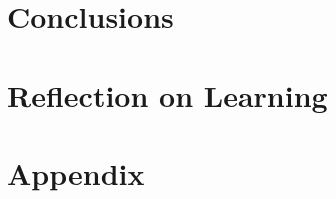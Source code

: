\documentclass[12pt, conference, final, a4paper, onecolumn, compsoc]{IEEEtran}
\begin{document}
\subsection*{}

\section{Conclusions}
\subsection*{}

\section{Reflection on Learning} %
\subsection*{}

\section{Appendix}
%
%
%


\bigskip 

\bigskip 

\bigskip 

\bigskip  \bigskip

 
\end{document}
